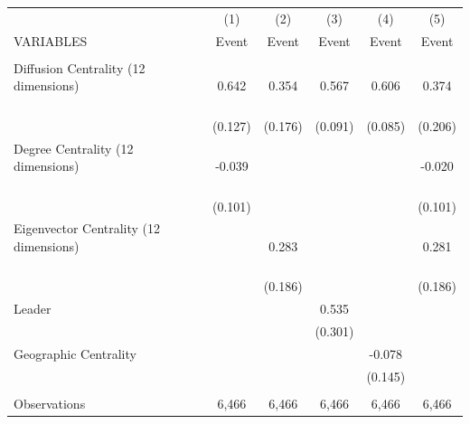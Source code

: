 \begin{tabular}{lccccc} \hline
 & (1) & (2) & (3) & (4) & (5) \\
VARIABLES & Event & Event & Event & Event & Event \\ \hline
 &  &  &  &  &  \\
Diffusion Centrality (12 dimensions) \ \ \ \ \ \ \ \ \ \ \ \ \ \ \ \ \ \ \ \ \ \ & 0.642 & 0.354 & 0.567 & 0.606 & 0.374 \\
 & (0.127) & (0.176) & (0.091) & (0.085) & (0.206) \\
Degree Centrality (12 dimensions) \ \ \ \ \ \ \ \ \ \ \ \ \ \ \ \ \ \ \ \ \ \ \ & -0.039 &  &  &  & -0.020 \\
 & (0.101) &  &  &  & (0.101) \\
Eigenvector Centrality (12 dimensions) \ \ \ \ \ \ \ \ \ \ \ \ \ \ \ \ \ \ \ \ \ &  & 0.283 &  &  & 0.281 \\
 &  & (0.186) &  &  & (0.186) \\
Leader &  &  & 0.535 &  &  \\
 &  &  & (0.301) &  &  \\
Geographic Centrality &  &  &  & -0.078 &  \\
 &  &  &  & (0.145) &  \\
 &  &  &  &  &  \\
 Observations & 6,466 & 6,466 & 6,466 & 6,466 & 6,466 \\ \hline
\end{tabular}

